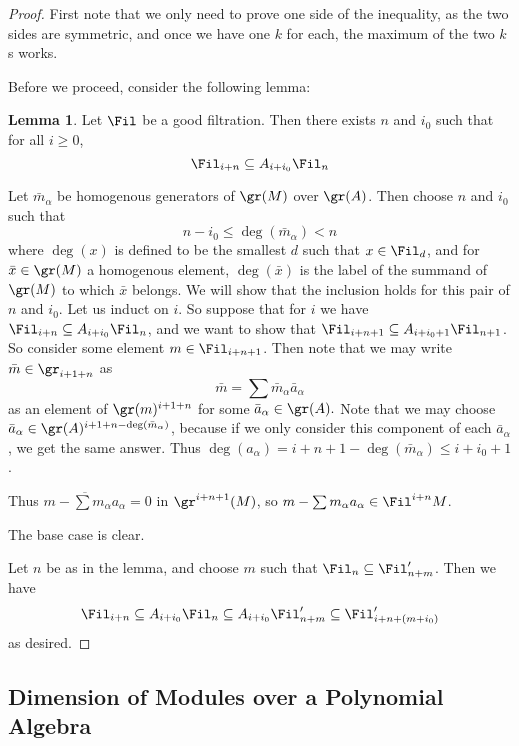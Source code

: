 \documentclass[12 pt]{article}
\theoremstyle{definition}
\newtheorem{lemma}[theorem]{Lemma}
\newcommand\ol{\overline}
\begin{document}
\begin{proof}
First note that we only need to prove one side of the inequality, as the two sides are symmetric, and once we have one $k$ for each, the maximum of the two $k$s works.

Before we proceed, consider the following lemma:

\begin{lemma} Let $\Fil$ be a good filtration. Then there exists $n$ and $i_0$ such that for all $i \geq 0$,
\[\Fil_{i+n} \subseteq A_{i+i_0}\Fil_n\]
\end{lemma}

 Let $\bar{m}_\alpha$ be homogenous generators of $\gr(M)$ over $\gr(A)$. Then choose $n$ and $i_0$ such that
\[n-i_0 \leq \deg(\bar{m}_\alpha) < n\]
where $\deg(x)$ is defined to be the smallest $d$ such that $x \in \Fil_d$, and for $\bar{x} \in \gr(M)$ a homogenous element, $\deg(\bar{x})$ is the label of the summand of $\gr(M)$ to which $\bar{x}$ belongs.
We will show that the inclusion holds for this pair of $n$ and $i_0$. Let us induct on $i$. So suppose that for $i$ we have $\Fil_{i+n} \subseteq A_{i+i_0} \Fil_n$, and we want to show that $\Fil_{i+n+1} \subseteq A_{i+i_0+1} \Fil_{n+1}$. So consider some element $m \in \Fil_{i+n+1}$. Then note that we may write $\bar{m} \in \gr_{i+1+n}$ as
\[\bar{m}=\sum \bar{m}_\alpha \bar a_\alpha\]
as an element of $\gr(m)^{i+1+n}$ for some $\bar a_\alpha \in \gr(A).$ Note that we may choose $\bar a_\alpha \in \gr(A)^{i+1+n-\deg(\bar m_\alpha)}$, because if we only consider this component of each $\bar a_\alpha$, we get the same answer. Thus $\deg(a_\alpha)=i+n+1-\deg(\bar m_\alpha) \leq i+i_0+1$.

Thus $\ol{m-\sum m_\alpha a_\alpha}=0$ in $\gr^{i+n+1}(M)$, so $m-\sum m_\alpha a_\alpha \in \Fil^{i+n}M$.

The base case is clear.

\medskip

 Let $n$ be as in the lemma, and choose $m$ such that $\Fil_n \subseteq \Fil_{n+m}'$. Then we have
\[\Fil_{i+n} \subseteq A_{i+i_0} \Fil_n \subseteq A_{i+i_0}\Fil_{n+m}' \subseteq \Fil_{i+n+(m+i_0)}'\]
as desired.

\end{proof}



\subsection{Dimension of Modules over a Polynomial Algebra}
\end{document}
